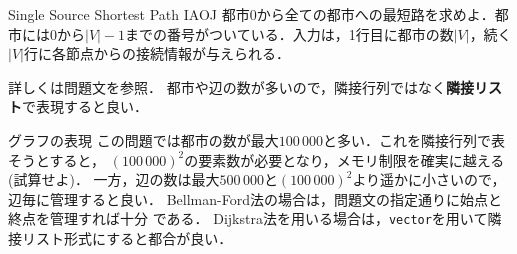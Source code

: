 \begin{pbox}{Single Source Shortest Path I}{AOJ}
都市$0$から全ての都市への最短路を求めよ．都市には$0$から$|V|-1$までの番号がついている．入力は，1行目に都市の数$|V|$，続く$|V|$行に各節点からの接続情報が与えられる．

詳しくは問題文を参照．
都市や辺の数が多いので，隣接行列ではなく\textbf{隣接リスト}で表現すると良い．

\end{pbox}

\begin{tipsbox}{グラフの表現}
  この問題では都市の数が最大$100\,000$と多い．これを隣接行列で表そうとすると，
$(100\,000)^2$の要素数が必要となり，メモリ制限を確実に越える(試算せよ)．
一方，辺の数は最大$500\,000$と$(100\,000)^2$より遥かに小さいので，辺毎に管理すると良い．
  Bellman-Ford法の場合は，問題文の指定通りに始点と終点を管理すれば十分
  である． Dijkstra法を用いる場合は，\texttt{vector}を用いて隣接リスト形式にすると都合が良い．
\end{tipsbox}


